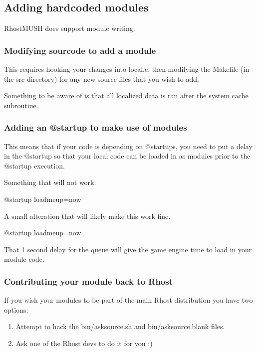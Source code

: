 \documentclass[letterpaper,10pt,english]{sphinxmanual}
\begin{document}
\subsection{Adding hardcoded modules}
\label{\detokenize{advanced:adding-hardcoded-modules}}
\sphinxAtStartPar
RhostMUSH does support module writing.


\subsubsection{Modifying sourcode to add a module}
\label{\detokenize{advanced:modifying-sourcode-to-add-a-module}}
\sphinxAtStartPar
This requires hooking your changes into local.c, then modifying the Makefile (in the src directory)
for any new source files that you wish to add.

\sphinxAtStartPar
Something to be aware of is that all localized data is ran after the system cache subroutine.


\subsubsection{Adding an @startup to make use of modules}
\label{\detokenize{advanced:adding-an-startup-to-make-use-of-modules}}
\sphinxAtStartPar
This means that if your code is depending on @startups, you need to put a delay in the @startup
so that your local code can be loaded in as modules prior to the @startup execution.

\sphinxAtStartPar
Something that will not work:

\sphinxAtStartPar
@startup  loadmeup=now

\sphinxAtStartPar
A small alteration that will likely make this work fine.

\sphinxAtStartPar
@startup   loadmeup=now

\sphinxAtStartPar
That 1 second delay for the queue will give the game engine time to load in your module code.


\subsubsection{Contributing your module back to Rhost}
\label{\detokenize{advanced:contributing-your-module-back-to-rhost}}
\sphinxAtStartPar
If you wish your modules to be part of the main Rhost distribution you have two options:
\begin{enumerate}
%
\item {} 
\sphinxAtStartPar
Attempt to hack the bin/asksource.sh and bin/asksource.blank files.

\item {} 
\sphinxAtStartPar
Ask one of the Rhost devs to do it for you :)

\end{enumerate}
\end{document}
